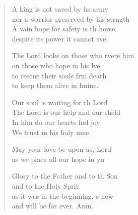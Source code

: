 \begin{verse}
\begin{patverse}
A king is not saved by h\pointup{\i}s army\Med\\
    nor a warrior preserved by his strngth\\
A vain hope for safety is th horse\Med\\
    despite its power it cannot sve.

The Lord looks on those who rvere him\Med\\
    on those who hope in his lve\\
to rescue their souls frm death\Med\\
    to keep them alive in fmine.

Our soul is waiting for th Lord\Med\\
    The Lord is our help and our sh\pointup{\i}eld\\
In him do our hearts f\pointup{\i}nd joy\Med\\
    We trust in his holy nme.

May your love be upon us,  Lord\Med\\
    as we place all our hope in yu

Glory to the Father and to th Son\Med\\
    and to the Holy Sp\pointup{\i}rit\\
as it was in the beginning, \pointup{\i}s now\Med\\
    and will be for ever. Amn.
  \end{patverse}
\end{verse}

